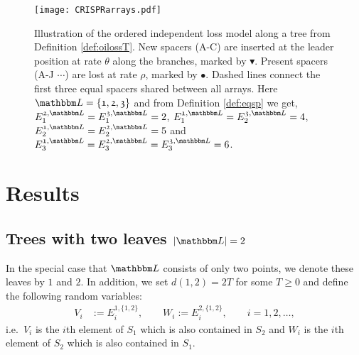 \documentclass[preprint,authoryear]{elsarticle}
\theoremstyle{definition}
\numberwithin{equation}{section}
\numberwithin{figure}{section}
\begin{document}
\begin{figure}
\centering
 \texttt{[image: CRISPRarrays.pdf]}
 \caption{
 \label{fig:oilossT}
 Illustration of the ordered independent loss model along a tree from Definition \ref{def:oilossT}.
 New spacers (A-C) are inserted at the leader position at rate $\theta$ along the branches, marked by $\blacktriangledown$.
 Present spacers (A-J $\cdots$) are lost at rate $\rho$, marked by $\bullet$. Dashed lines connect the first three equal spacers shared between all arrays.
 Here $\mathbbm L = \{\mathfrak 1, \mathfrak 2, \mathfrak 3\}$ and from Definition \ref{def:eqsp} we get, 
 $E_{1}^{\mathfrak 2, \mathbbm L} = E_{1}^{\mathfrak 3, \mathbbm L} = 2$,
 $E_{1}^{\mathfrak 1, \mathbbm L} = E_{2}^{\mathfrak 3, \mathbbm L} = 4$,
 $E_{2}^{\mathfrak 1, \mathbbm L} = E_{2}^{\mathfrak 2, \mathbbm L} = 5$
 and $E_{3}^{\mathfrak 1, \mathbbm L} = E_{3}^{\mathfrak 2, \mathbbm L} = E_{3}^{\mathfrak 3, \mathbbm L} = 6$.
 }
\end{figure}


\section{Results}
\label{S:3}
\subsection[Trees with two leaves]{Trees with two leaves $|\mathbbm L|=2$}
In the special case that $\mathbbm L$ consists of only two points, we
denote these leaves by $\mathfrak 1$ and $\mathfrak 2$. In addition,
we set $d(\mathfrak 1, \mathfrak 2)=2T$ for some $T\geq 0$ and define
the following random variables:
\begin{align*}
  V_i & := E_{i}^{\mathfrak 1, \{\mathfrak 1, \mathfrak 2\}}, \qquad 
        W_i := E_{i}^{\mathfrak 2, \{\mathfrak 1, \mathfrak 2\}}, \qquad i=1,2,\dots,
\end{align*}
i.e.\ $V_i$ is the $i$th element of $S_{\mathfrak 1}$ which is also
contained in $S_{\mathfrak 2}$ and $W_i$ is the $i$th element of
$S_{\mathfrak 2}$ which is also contained in $S_{\mathfrak 1}$.

\end{document}
